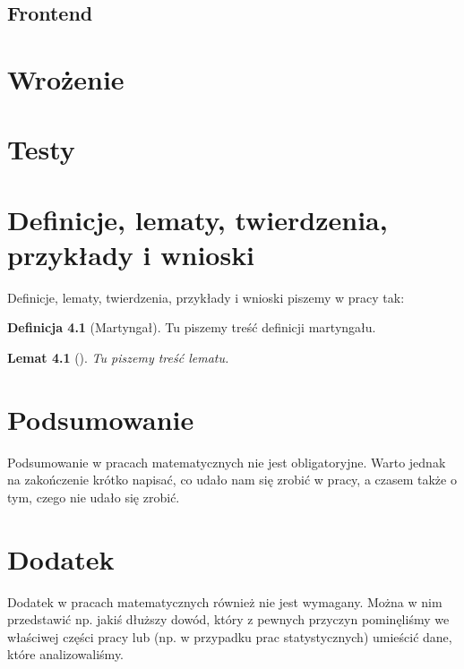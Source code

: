 \documentclass[inzynierska]{pwr_wmat_praca_dyplomowa}
\theoremstyle{plain}
\numberwithin{theorem}{chapter}
\newtheorem{lemma}[theorem]{Lemat}
\theoremstyle{definition}
\numberwithin{theorem}{chapter}
\newtheorem{definition}[theorem]{Definicja}
\begin{document}
    \section{Frontend}
    \chapter{Wrożenie}
    \chapter{Testy}




    \chapter{Definicje, lematy, twierdzenia, przykłady i wnioski}
    Definicje, lematy, twierdzenia, przykłady i wnioski piszemy w pracy tak:
    \begin{definition}[Martyngał]
        Tu piszemy treść definicji martyngału.
    \end{definition}
    \begin{lemma}[]%
        Tu piszemy treść lematu.
    \end{lemma}

    {\backmatter \chapter{Podsumowanie}}
    Podsumowanie w pracach matematycznych nie jest obligatoryjne. Warto jednak na zakończenie krótko napisać, co udało nam się zrobić w pracy, a czasem także o tym, czego nie udało się zrobić.

    {\backmatter \chapter{Dodatek}}
    Dodatek w pracach matematycznych również nie jest wymagany. Można w nim przedstawić np. jakiś dłuższy dowód, który z pewnych przyczyn pominęliśmy we właściwej części pracy lub (np. w przypadku prac statystycznych) umieścić dane, które analizowaliśmy.

    \newpage
\end{document}
